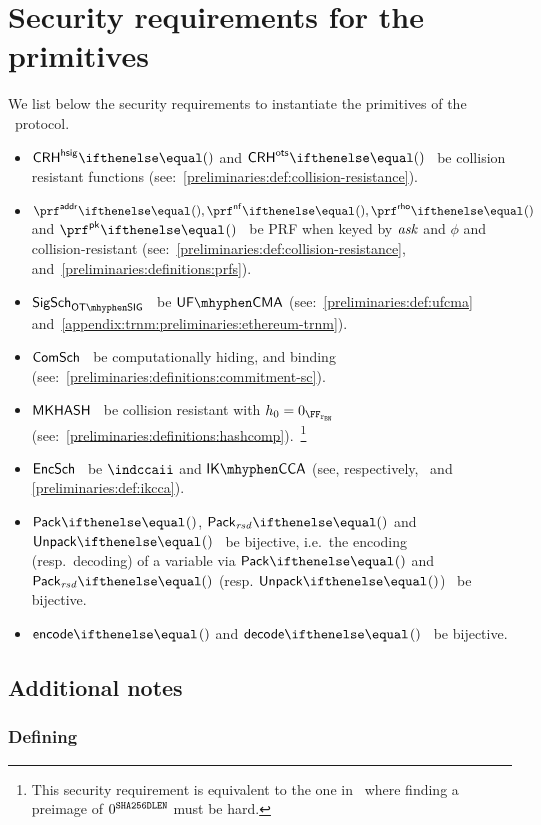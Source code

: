 
\section{Security requirements for the primitives}\label{zeth-protocol:sec-req}

We list below the security requirements to instantiate the primitives of the \zeth~protocol.

\begin{itemize}
    \item $\crhhsig{}$ and $\crhots{}$ \MUST~be collision resistant functions (see:~\cref{preliminaries:def:collision-resistance}).
    \item $\prfaddr{}{}, \prfnf{}{}, \prfrho{}{}$ and $\prfpk{}{}$ \MUST~be PRF when keyed by $\mathit{ask}$ and $\phi$ and collision-resistant (see:~\cref{preliminaries:def:collision-resistance}, and~\cref{preliminaries:definitions:prfs}).
    \item $\otsigscheme$ \MUST~be $\ufcma$ (see:~\cref{preliminaries:def:ufcma} and~\cref{appendix:trnm:preliminaries:ethereum-trnm}).
    \item $\mathsf{ComSch}$ \MUST~be computationally hiding, and binding (see:~\cref{preliminaries:definitions:commitment-sc}).
    \item $\mathsf{MKHASH}$ \MUST~be collision resistant with $h_0 = {0}_{\FFx{\rBN}}$ (see:~\cref{preliminaries:definitions:hashcomp}).~\footnote{This security requirement is equivalent to the one in~\cite[Section 5.4.1.3]{zcashprotocol} where finding a preimage of $0^{\mathtt{SHA256DLEN}}$ must be hard.}
    \item $\mathsf{EncSch}$ \MUST~be $\indccaii$ and $\ikcca$ (see, respectively,~\cite[Definition 8]{abdalla1999dhaes} and \cref{preliminaries:def:ikcca}).
    \item $\pack{}{}$, $\packResBits{}$ and $\unpack{}{}$ \MUST~be bijective, i.e.~the encoding (resp.~decoding) of a variable via $\pack{}{}$ and $\packResBits{}$ (resp. $\unpack{}{}$) \MUST~be bijective.
    \item $\encode{}{}$ and $\decode{}{}$ \MUST~be bijective.
\end{itemize}

\subsection{Additional notes}\label{zeth-protocol:sec-req:add-notes}

\subsubsection{Defining \hsig}\label{zeth-protocol:sec-req:add-notes:def-hsig}

